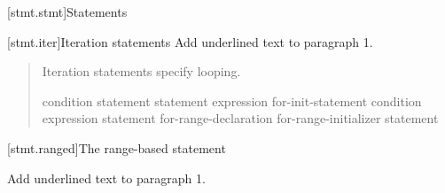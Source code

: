 
[stmt.stmt]{Statements}%

\setcounter{section}{4}
[stmt.iter]{Iteration statements}%
Add underlined text to paragraph 1.

\begin{quote}
\pnum
Iteration statements specify looping.

%
%
%
%
\begin{bnf}
	\br
	 condition \terminal{)} statement\br
	 statement  expression \terminal{) ;}\br
	 for-init-statement condition\opt \terminal{;} expression\opt \terminal{)} statement\br
	  \terminal{(} for-range-declaration \terminal{:} for-range-initializer \terminal{)} statement\br
\end{bnf}
\end{quote}


\setcounter{subsection}{3}
[stmt.ranged]{The range-based  statement}%

Add underlined text to paragraph 1.

